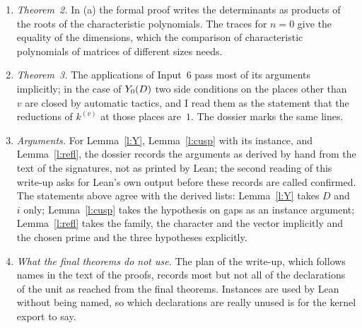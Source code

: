 \documentclass[11pt,a4paper]{article}
\newcommand{\m}[1]{\mbox{$#1$}}        %
\theoremstyle{plainx}
\theoremstyle{uprightx}
\begin{document}
\begin{enumerate}[label=\textup{\arabic*.},leftmargin=1.6em,itemsep=5pt]
It uses of a good family only that it has a primitive label above~$g_0(D)$. The Hecke elements $\Pi^p$ are chosen for
all eigensystems, and the theorem on the cubic twist of the note \emph{Primitive labels} is applied to all pairs \m{(p,v)}, not only
for \m{p\in\mathcal F}.
\item \emph{Theorem~2.} In (a) the formal proof writes the determinants as products of the roots of the
characteristic polynomials. The traces for \m{n=0} give the equality of the dimensions, which the comparison of
characteristic polynomials of matrices of different sizes needs.
\item \emph{Theorem~3.} The applications of Input~6 pass most of its arguments implicitly; in the case of
\m{\spaceY{D}{0}} two side conditions on the places other than~$v$ are closed by automatic tactics, and I read
them as the statement that the reductions of $k^{(v)}$ at those places are~$1$. The dossier marks the same lines.
\item \emph{Arguments.} For Lemma~\ref{l:Y}, Lemma~\ref{l:cusp} with its instance, and Lemma~\ref{l:refl}, the
dossier records the arguments as derived by hand from the text of the signatures, not as printed by Lean; the
second reading of this write-up asks for Lean's own output before these records are called confirmed. The
statements above agree with the derived lists: Lemma~\ref{l:Y} takes $D$ and~$i$ only; Lemma~\ref{l:cusp} takes
the hypothesis on gaps as an instance argument; Lemma~\ref{l:refl} takes the family, the character and the vector
implicitly and the chosen prime and the three hypotheses explicitly.
\item \emph{What the final theorems do not use.} The plan of the write-up, which follows names in the text of
the proofs, records most but not all of the \UnitMembers{} declarations of the unit as reached from the final
theorems. Instances are used by Lean without being named, so which declarations are really unused is for the
kernel export to say.
\end{enumerate}
\end{document}
